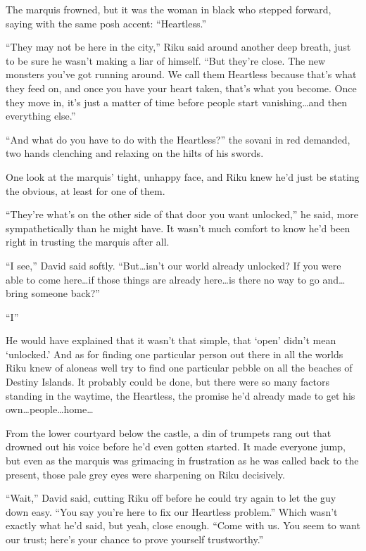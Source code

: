 The marquis frowned, but it was the woman in black who stepped forward, saying with the same posh accent: ``Heartless.''

``They may not be here in the city,'' Riku said around another deep breath, just to be sure he wasn't making a liar of himself. ``But they're close. The new monsters you've got running around. We call them Heartless because that's what they feed on, and once you have your heart taken, that's what you become. Once they move in, it's just a matter of time before people start vanishing\ldots and then everything else.''

``And what do you have to do with the Heartless?'' the sovani in red demanded, two hands clenching and relaxing on the hilts of his swords.

One look at the marquis' tight, unhappy face, and Riku knew he'd just be stating the obvious, at least for one of them.

``They're what's on the other side of that door you want unlocked,'' he said, more sympathetically than he might have. It wasn't much comfort to know he'd been right in trusting the marquis after all.

``I see,'' David said softly. ``But\ldots isn't our world already unlocked? If you were able to come here\ldots if those things are already here\ldots is there no way to go and\ldots bring someone back?''

``I\textemdash''

He would have explained that it wasn't that simple, that `open' didn't mean `unlocked.' And as for finding one particular person out there in all the worlds Riku knew of alone\textemdash as well try to find one particular pebble on all the beaches of Destiny Islands. It probably could be done, but there were so many factors standing in the way\textemdash time, the Heartless, the promise he'd already made to get his own\ldots people\ldots home\ldots 

From the lower courtyard below the castle, a din of trumpets rang out that drowned out his voice before he'd even gotten started. It made everyone jump, but even as the marquis was grimacing in frustration as he was called back to the present, those pale grey eyes were sharpening on Riku decisively.

``Wait,'' David said, cutting Riku off before he could try again to let the guy down easy. ``You say you're here to fix our Heartless problem.'' Which wasn't exactly what he'd said, but yeah, close enough. ``Come with us. You seem to want our trust; here's your chance to prove yourself trustworthy.''

